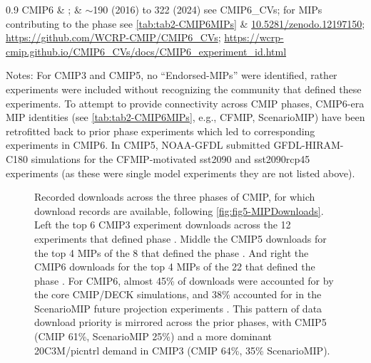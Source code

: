 \documentclass[manuscript]{copernicus}
\def\cred#1{{\color{red}#1}}
\begin{document}
\begin{table}[htp]
{\begin{tabularx}{0.9\textwidth}
			CMIP6 & \citet{eyring_overview_2016}; \citet{durack_cmip6_2024} & $\sim$190 (2016) to 322 (2024) see CMIP6\_CVs; for MIPs contributing to the phase see \autoref{tab:tab2-CMIP6MIPs} & \href{http://doi.org/10.5281/zenodo.12197150}{10.5281/zenodo.12197150}; \url{https://github.com/WCRP-CMIP/CMIP6\_CVs}; \url{https://wcrp-cmip.github.io/CMIP6\_CVs/docs/CMIP6\_experiment\_id.html}\\
			\hline		
		\end{tabularx}
	} %
	\label{tab:tabAppA1-MIPExperiments}
	\footnotesize{Notes: For CMIP3 and CMIP5, no ``Endorsed-MIPs'' were identified, rather experiments were included without recognizing the community that defined these experiments. To attempt to provide connectivity across CMIP phases, CMIP6-era MIP identities (see \autoref{tab:tab2-CMIP6MIPs}, e.g., CFMIP, ScenarioMIP) have been retrofitted back to prior phase experiments which led to corresponding experiments in CMIP6. In CMIP5, NOAA-GFDL submitted GFDL-HIRAM-C180 simulations for the CFMIP-motivated sst2090 and sst2090rcp45 experiments (as these were single model experiments they are not listed above).}
\end{table}


\begin{figure}
    \centering
    
    \caption{Recorded downloads across the three phases of CMIP, for which download records are available, following \autoref{fig:fig5-MIPDownloads}. Left the top 6 CMIP3 experiment downloads across the 12 experiments that defined phase \citep{meehl_wcrp_2007}. Middle the CMIP5 downloads for the top 4 MIPs of the 8 that defined the phase \citep[\autoref{tab:tabAppA1-MIPExperiments};][]{taylor_overview_2012}. And right the CMIP6 downloads for the top 4 MIPs of the 22 that defined the phase \cite[[see \autoref{tab:tab2-CMIP6MIPs};][]{eyring_overview_2016}. For CMIP6, almost 45\% of downloads were accounted for by the core CMIP/DECK simulations, and 38\% accounted for in the ScenarioMIP future projection experiments \citep{oneill_scenario_2016}. This pattern of data download priority is mirrored across the prior phases, with CMIP5 (CMIP 61\%, ScenarioMIP 25\%) and a more dominant 20C3M/picntrl demand in CMIP3 (CMIP 64\%, 35\% ScenarioMIP).}
    \label{fig:figA1-MIPDownloads}
\end{figure}
\end{document}
